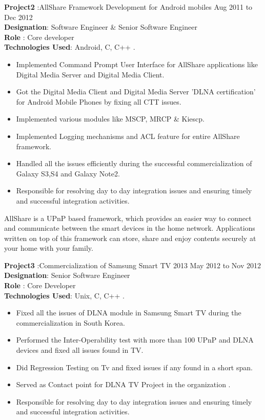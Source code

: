 \documentclass{resumeclass}
\begin{document}
\begin{resume}
\textbf{Project2} :AllShare Framework Development for Android mobiles \hfill      Aug 2011 to Dec 2012 \\
\textbf{Designation}: Software Engineer \& Senior Software Engineer\\
\textbf{Role} : Core developer\\
\textbf{Technologies Used}: Android, C, C++ .

 \begin{itemize} \itemsep -2pt
  \item  Implemented Command Prompt User Interface for AllShare applications like Digital Media Server and Digital Media Client.
  \item  Got the Digital Media Client and Digital Media Server 'DLNA certification' for Android Mobile Phones by fixing all CTT issues.
  \item  Implemented various modules like MSCP, MRCP \& Kiescp.
  \item  Implemented Logging mechanisms and ACL feature for entire AllShare framework.
  \item  Handled all the issues efficiently during the successful commercialization of Galaxy S3,S4 and Galaxy Note2.
  \item Responsible for resolving day to day integration issues and ensuring timely and successful integration activities.
\end{itemize} \vspace{-6pt}

AllShare is a UPnP based framework, which provides an easier way to connect and communicate between the smart devices in the home network. Applications written on top of this framework can store, share and enjoy contents securely at your home with your family.

\textbf{Project3} :Commercialization of Samsung Smart TV 2013 \hfill      May 2012 to Nov 2012 \\
\textbf{Designation}: Senior Software Engineer\\
\textbf{Role} : Core Developer\\
\textbf{Technologies Used}: Unix, C, C++ .

 \begin{itemize} \itemsep -2pt
  \item  Fixed all the issues of DLNA module in Samsung Smart TV during the commercialization in South Korea.
  \item  Performed the Inter-Operability test with more than 100 UPnP and DLNA devices and fixed all issues found in TV.
  \item  Did Regression Testing on Tv and fixed issues if any found in a short span.
  \item  Served as Contact point for DLNA TV Project in the organization .
  \item Responsible for resolving day to day integration issues and ensuring timely and successful integration activities.
\end{itemize} \vspace{-6pt}


\end{resume}
\end{document}
